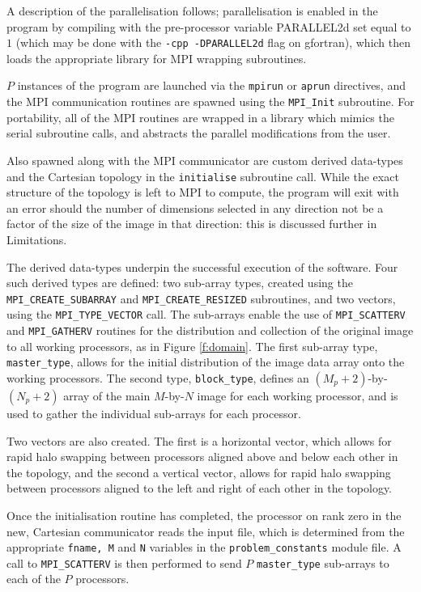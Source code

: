 \documentclass{article} %
\begin{document}
A description of the parallelisation follows; parallelisation is enabled in the program by compiling with the pre-processor variable PARALLEL2d set equal to $1$ (which may be done with the \texttt{-cpp -DPARALLEL2d} flag on gfortran), which then loads the appropriate library for MPI wrapping subroutines.

$P$ instances of the program are launched via the \texttt{mpirun} or \texttt{aprun} directives, and the MPI communication routines are spawned using the \texttt{MPI\_Init} subroutine.
For portability, all of the MPI routines are wrapped in a library which mimics the serial subroutine calls, and abstracts the parallel modifications from the user.

Also spawned along with the MPI communicator are custom derived data-types and the Cartesian topology in the \texttt{initialise} subroutine call. While the exact structure of the topology is left to MPI to compute, the program will exit with an error should the number of dimensions selected in any direction not be a factor of the size of the image in that direction: this is discussed further in Limitations. 

The derived data-types underpin the successful execution of the software. Four such derived types are defined: two sub-array types, created using the \texttt{MPI\_CREATE\_SUBARRAY} and \texttt{MPI\_CREATE\_RESIZED} subroutines, and two vectors, using the \texttt{MPI\_TYPE\_VECTOR} call.
The sub-arrays enable the use of \texttt{MPI\_SCATTERV} and \texttt{MPI\_GATHERV} routines for the distribution and collection of the original image to all working processors, as in Figure \ref{f:domain}.
The first sub-array type, \texttt{master\_type}, allows for the initial distribution of the image data array onto the working processors.
The second type, \texttt{block\_type}, defines an $(M_p + 2)$-by-$(N_p + 2)$ array of the main $M$-by-$N$ image for each working processor, and is used to gather the individual sub-arrays for each processor.

Two vectors are also created. 
The first is a horizontal vector, which allows for rapid halo swapping between processors aligned above and below each other in the topology, and the second a vertical vector, allows for rapid halo swapping between processors aligned to the left and right of each other in the topology.

Once the initialisation routine has completed, the processor on rank zero in the new, Cartesian communicator reads the input file, which is determined from the appropriate \texttt{fname, M} and \texttt{N} variables in the \texttt{problem\_constants} module file. A call to \texttt{MPI\_SCATTERV} is then performed to send $P$ \texttt{master\_type} sub-arrays to each of the $P$ processors.
\end{document}
